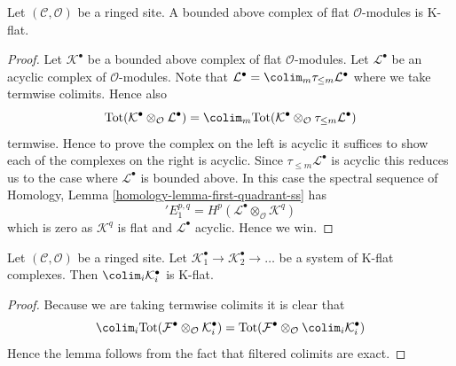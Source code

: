 \begin{lemma}
\label{lemma-bounded-flat-K-flat}
Let $(\mathcal{C}, \mathcal{O})$ be a ringed site. A bounded above complex
of flat $\mathcal{O}$-modules is K-flat.
\end{lemma}

\begin{proof}
Let $\mathcal{K}^\bullet$ be a bounded above complex of flat
$\mathcal{O}$-modules. Let $\mathcal{L}^\bullet$ be an acyclic complex
of $\mathcal{O}$-modules. Note that
$\mathcal{L}^\bullet = \colim_m \tau_{\leq m}\mathcal{L}^\bullet$
where we take termwise colimits. Hence also
$$
\text{Tot}(\mathcal{K}^\bullet \otimes_\mathcal{O} \mathcal{L}^\bullet)
=
\colim_m \text{Tot}(
\mathcal{K}^\bullet \otimes_\mathcal{O} \tau_{\leq m}\mathcal{L}^\bullet)
$$
termwise. Hence to prove the complex on the left is acyclic it suffices
to show each of the complexes on the right is acyclic. Since
$\tau_{\leq m}\mathcal{L}^\bullet$ is acyclic this reduces us to the
case where $\mathcal{L}^\bullet$ is bounded above.
In this case the spectral sequence of
Homology, Lemma \ref{homology-lemma-first-quadrant-ss}
has
$$
{}'E_1^{p, q} = H^p(\mathcal{L}^\bullet \otimes_\mathcal{O} \mathcal{K}^q)
$$
which is zero as $\mathcal{K}^q$ is flat and $\mathcal{L}^\bullet$ acyclic.
Hence we win.
\end{proof}

\begin{lemma}
\label{lemma-colimit-K-flat}
Let $(\mathcal{C}, \mathcal{O})$ be a ringed site.
Let $\mathcal{K}_1^\bullet \to \mathcal{K}_2^\bullet \to \ldots$
be a system of K-flat complexes.
Then $\colim_i \mathcal{K}_i^\bullet$ is K-flat.
\end{lemma}

\begin{proof}
Because we are taking termwise colimits it is clear that
$$
\colim_i \text{Tot}(
\mathcal{F}^\bullet \otimes_\mathcal{O} \mathcal{K}_i^\bullet)
=
\text{Tot}(\mathcal{F}^\bullet \otimes_\mathcal{O}
\colim_i \mathcal{K}_i^\bullet)
$$
Hence the lemma follows from the fact that filtered colimits are
exact.
\end{proof}


